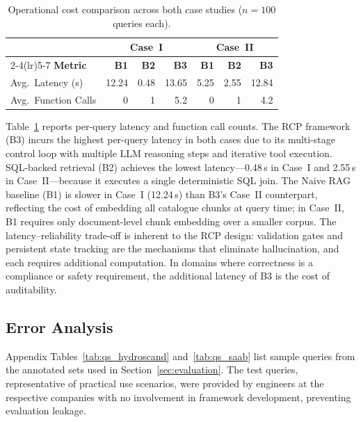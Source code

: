 \documentclass[largeformat]{interact}
\begin{document}
\begin{table}[h]
    \centering
    \caption{Operational cost comparison across both case studies ($n = 100$ queries each).}
    \label{tab:operational_cost_combined}
    \small
    \setlength{\tabcolsep}{5pt}
    \renewcommand{\arraystretch}{1.1}
    \begin{tabular}{@{}lrrrrrr@{}}
        \toprule
        & \multicolumn{3}{c}{\textbf{Case~I}} & \multicolumn{3}{c}{\textbf{Case~II}} \\
        \cmidrule(lr){2-4}\cmidrule(lr){5-7}
        \textbf{Metric} & \textbf{B1} & \textbf{B2} & \textbf{B3} & \textbf{B1} & \textbf{B2} & \textbf{B3} \\
        \midrule
        Avg.\ Latency (s)    & 12.24 & 0.48  & 13.65 & 5.25  & 2.55  & 12.84 \\
        Avg.\ Function Calls & 0     & 1     & 5.2   & 0     & 1     & 4.2   \\
        \bottomrule
    \end{tabular}
\end{table}

Table~\ref{tab:operational_cost_combined} reports per-query latency and function call counts. The RCP framework (B3) incurs the highest per-query latency in both cases due to its multi-stage control loop with multiple LLM reasoning steps and iterative tool execution. SQL-backed retrieval (B2) achieves the lowest latency---0.48\,s in Case~I and 2.55\,s in Case~II---because it executes a single deterministic SQL join. The Naive RAG baseline (B1) is slower in Case~I (12.24\,s) than B3's Case~II counterpart, reflecting the cost of embedding all catalogue chunks at query time; in Case~II, B1 requires only document-level chunk embedding over a smaller corpus. The latency--reliability trade-off is inherent to the RCP design: validation gates and persistent state tracking are the mechanisms that eliminate hallucination, and each requires additional computation. In domains where correctness is a compliance or safety requirement, the additional latency of B3 is the cost of auditability.

\subsection{Error Analysis}
\label{subsec:error_analysis}
Appendix Tables~\ref{tab:qs_hydroscand} and~\ref{tab:qs_saab} list sample queries from the annotated sets used in Section~\ref{sec:evaluation}. The test queries, representative of practical use scenarios, were provided by engineers at the respective companies with no involvement in framework development, preventing evaluation leakage.
\end{document}
